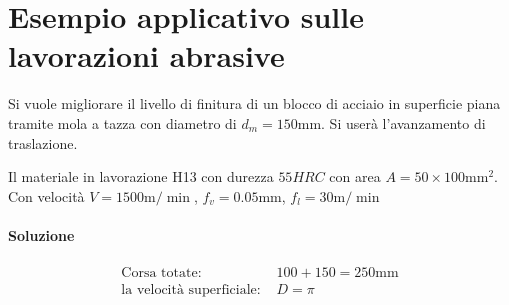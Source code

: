 \chapter{Esempio applicativo sulle lavorazioni abrasive}
\label{exe:EsempioAbrasioni}

Si vuole migliorare il livello di finitura di un blocco di acciaio in superficie piana tramite mola a tazza con diametro di $d_m = 150\unit{\mm}$. Si userà l'avanzamento di traslazione.

Il materiale in lavorazione H13 con durezza $55\unit{HRC}$
con area $A = 50 \times 100 \unit{\mm^2}$.
Con velocità $V = 1500\unit{\m/\min}$, $f_v = 0.05\unit{\mm}$, $f_l = 30\unit{\m/\min}$
\subsubsection*{Soluzione}
\begin{align*}
\text{Corsa totate: } &100 + 150 = 250\unit{\mm}\\
\text{la velocità superficiale: } &D = \pi \\
\end{align*}

